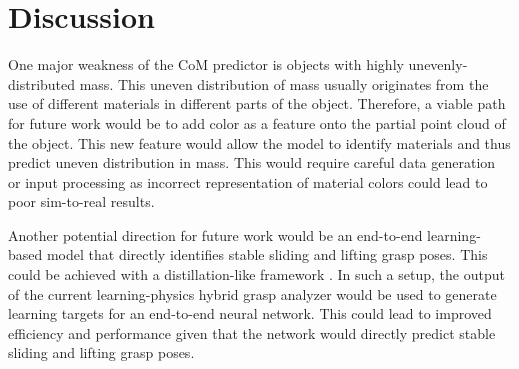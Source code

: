 \documentclass[12pt]{ucsddissertation}
\begin{document}
\section{Discussion}
One major weakness of the CoM predictor is objects with highly unevenly-distributed mass. This uneven distribution of mass usually originates from the use of different materials in different parts of the object. Therefore, a viable path for future work would be to add color as a feature onto the partial point cloud of the object. This new feature would allow the model to identify materials and thus predict uneven distribution in mass. This would require careful data generation or input processing as incorrect representation of material colors could lead to poor sim-to-real results.

Another potential direction for future work would be an end-to-end learning-based model that directly identifies stable sliding and lifting grasp poses. This could be achieved with a distillation-like framework \cite{hinton2015distilling}. In such a setup, the output of the current learning-physics hybrid grasp analyzer would be used to generate learning targets for an end-to-end neural network. This could lead to improved efficiency and performance given that the network would directly predict stable sliding and lifting grasp poses.

\appendix

\backmatter

\end{document}
